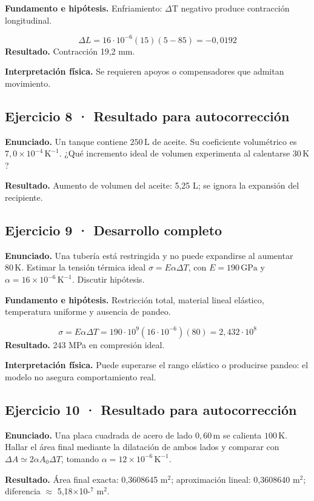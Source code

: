\documentclass[11pt,a4paper]{article}
\begin{document}
\textbf{Fundamento e hipótesis.} Enfriamiento: \ensuremath{\Delta}T negativo produce contracción longitudinal.

\[
\Delta L=16\cdot10^{-6}(15)(5-85)=-0{,}0192
\]
\textbf{Resultado.} Contracción 19,2 mm.

\textbf{Interpretación física.} Se requieren apoyos o compensadores que admitan movimiento.


\subsection*{Ejercicio 8 · Resultado para autocorrección}
\textbf{Enunciado.} Un tanque contiene \(250\,\mathrm L\) de aceite. Su coeficiente volumétrico es \(7{,}0\times10^{-4}\,\mathrm K^{-1}\). ¿Qué incremento ideal de volumen experimenta al calentarse \(30\,\mathrm K\)?

\textbf{Resultado.} Aumento de volumen del aceite: 5,25 L; se ignora la expansión del recipiente.


\subsection*{Ejercicio 9 · Desarrollo completo}
\textbf{Enunciado.} Una tubería está restringida y no puede expandirse al aumentar \(80\,\mathrm K\). Estimar la tensión térmica ideal \(\sigma=E\alpha\Delta T\), con \(E=190\,\mathrm{GPa}\) y \(\alpha=16\times10^{-6}\,\mathrm K^{-1}\). Discutir hipótesis.

\textbf{Fundamento e hipótesis.} Restricción total, material lineal elástico, temperatura uniforme y ausencia de pandeo.

\[
\sigma=E\alpha\Delta T=190\cdot10^9(16\cdot10^{-6})(80)=2{,}432\cdot10^8
\]
\textbf{Resultado.} 243 MPa en compresión ideal.

\textbf{Interpretación física.} Puede superarse el rango elástico o producirse pandeo: el modelo no asegura comportamiento real.


\subsection*{Ejercicio 10 · Resultado para autocorrección}
\textbf{Enunciado.} Una placa cuadrada de acero de lado \(0{,}60\,\mathrm m\) se calienta \(100\,\mathrm K\). Hallar el área final mediante la dilatación de ambos lados y comparar con \(\Delta A\simeq 2\alpha A_0\Delta T\), tomando \(\alpha=12\times10^{-6}\,\mathrm K^{-1}\).

\textbf{Resultado.} Área final exacta: 0,3608645 m\ensuremath{^2}; aproximación lineal: 0,3608640 m\ensuremath{^2}; diferencia \ensuremath{\approx} 5,18\ensuremath{\times}10-\ensuremath{^7} m\ensuremath{^2}.
\end{document}
